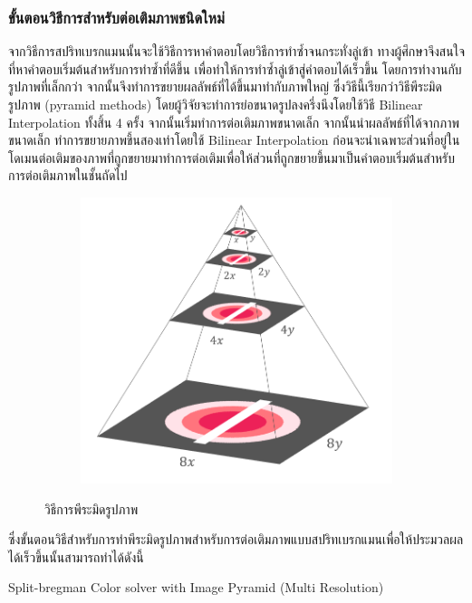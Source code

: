 \documentclass[hidelinks, a4paper,12pt]{article}
\numberwithin{equation}{section}							%
\numberwithin{equation}{section}
\begin{document}
{	\subsubsection{ขั้นตอนวิธีการสำหรับต่อเติมภาพชนิดใหม่}
	\hspace{1cm} จากวิธีการสปริทเบรกแมนนั้นจะใช้วิธีการหาคำตอบโดยวิธีการทำซ้ำจนกระทั่งลู่เข้า ทางผู้ศึกษาจึงสนใจที่หาคำตอบเริ่มต้นสำหรับการทำซ้ำที่ดีขึ้น เพื่อทำให้การทำซ้ำลู่เข้าสู่คำตอบได้เร็วขึ้น โดยการทำงานกับรูปภาพที่เล็กกว่า จากนั้นจึงทำการขยายผลลัพธ์ที่ได้ขึ้นมาทำกับภาพใหญ่ ซึ่งวิธีนี้เรียกว่าวิธีพีระมิดรูปภาพ (pyramid methods) \cite{ref:image-pyramid}  โดยผู้วิจัยจะทำการย่อขนาดรูปลงครึ่งนึงโดยใช้วิธี Bilinear Interpolation ทั้งสิ้น 4 ครั้ง จากนั้นเริ่มทำการต่อเติมภาพขนาดเล็ก จากนั้นนำผลลัพธ์ที่ได้จากภาพขนาดเล็ก ทำการขยายภาพขึ้นสองเท่าโดยใช้ Bilinear Interpolation
	 ก่อนจะนำเฉพาะส่วนที่อยู่ในโดเมนต่อเติมของภาพที่ถูกขยายมาทำการต่อเติมเพื่อให้ส่วนที่ถูกขยายขึ้นมาเป็นคำตอบเริ่มต้นสำหรับการต่อเติมภาพในชั้นถัดไป
	 	\begin{figure}[H]
	 	\centering
	 	\begin{subfigure}{0.4\linewidth}
	 		\centering
	 		\includegraphics[width=0.8\linewidth]{images/image_inpaint_synthetic/image_pyramid.png}
	 	\end{subfigure}
 		 \caption{วิธีการพีระมิดรูปภาพ}
	 \end{figure}
 	\hspace{1cm} ซึ่งขั้นตอนวิธีสำหรับการทำพีระมิดรูปภาพสำหรับการต่อเติมภาพแบบสปริทเบรกแมนเพื่อให้ประมวลผลได้เร็วขึ้นนั้นสามารถทำได้ดังนี้
	\begin{algorithm}[H]
		\label{algo:MultiSplitBregmanColorInpaint}
		\caption{Split-bregman Color solver with Image Pyramid (Multi Resolution)}

\end{algorithm}}
\end{document}

